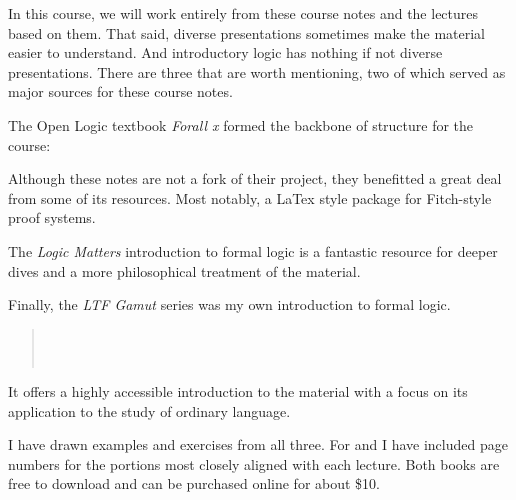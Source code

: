 \newpage
In this course, we will work entirely from these course notes and the lectures
based on them. That said, diverse presentations sometimes make the material
easier to understand. And introductory logic has nothing if not diverse
presentations. There are three that are worth mentioning, two of which served
as major sources for these course notes.

\begin{outline}[enumerate]

\1 The Open Logic textbook \emph{Forall x} formed the backbone of structure for
the course:
\begin{quote}
\end{quote}
Although these notes are not a fork of their project, they benefitted a great
deal from some of its resources. Most notably, a LaTex style package for
Fitch-style proof systems.

\1 The \emph{Logic Matters} introduction to formal logic is a fantastic resource
for deeper dives and a more philosophical treatment of the material.
\begin{quote}
\end{quote}

\1 Finally, the \emph{LTF Gamut} series was my own introduction to formal logic.
\begin{quote}
   \\ \\
\end{quote}
It offers a highly accessible introduction to the material with a focus on its
application to the study of ordinary language.

\end{outline}

I have drawn examples and exercises from all three. For \cite{Smi20} and
\cite{Mag25} I have included page numbers for the portions most closely aligned
with each lecture. Both books are free to download and can be purchased online
for about \$10.

